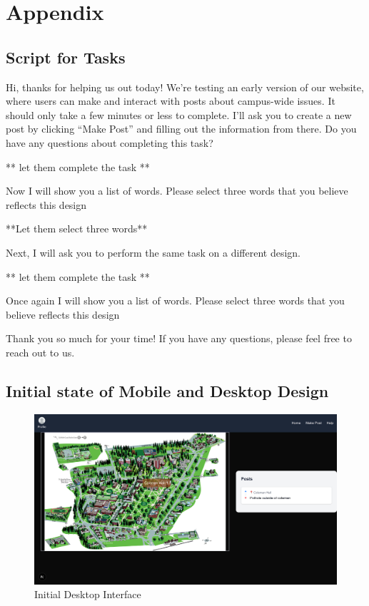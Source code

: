 \documentclass{article}
\begin{document}



\newpage 

\appendix

\section{Appendix}

\subsection{Script for Tasks}
\label{a:tasks}

Hi, thanks for helping us out today! We’re testing an early version of our website, where users can make and interact with posts about campus-wide issues. It should only take a few minutes or less to complete. I’ll ask you to create a new post by clicking “Make Post” and filling out the information from there. Do you have any questions about completing this task? 

** let them complete the task ** 

Now I will show you a list of words. Please select three words that you believe reflects this design

**Let them select three words**

Next, I will ask you to perform the same task on a different design.

** let them complete the task ** 

Once again I will show you a list of words. Please select three words that you believe reflects this design

Thank you so much for your time! If you have any questions, please feel free to reach out to us.

\subsection{Initial state of Mobile and Desktop Design
}
\label{a:init-state}

\begin{figure}
    \centering
    \includegraphics[width=0.5\linewidth]{desktop.png}
    \caption{Initial Desktop Interface}
    \label{fig:desktop}
\end{figure}
\end{document}
